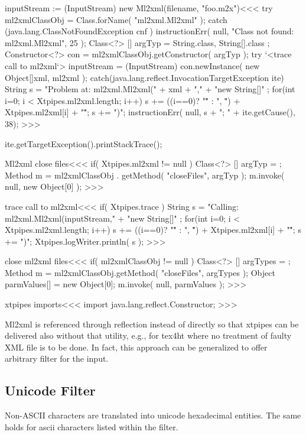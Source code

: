 \documentclass{article}
\begin{document}
\<inputStream := (InputStream) new Ml2xml(filename, "foo.m2x")\><<<
try{
   ml2xmlClassObj = Class.forName( "ml2xml.Ml2xml" );
} catch (java.lang.ClassNotFoundException cnf ){
   instructionErr( null, "Class not found: ml2xml.Ml2xml", 25 );
}
Class<?> [] argTyp = { String.class, String[].class };
Constructor<?> con = ml2xmlClassObj.getConstructor( argTyp );
try{
   `<trace call to ml2xml`>
   inputStream = (InputStream) con.newInstance(
         new Object[]{xml, ml2xml}
      );
} catch(java.lang.reflect.InvocationTargetException ite){
   String s = "Problem at: ml2xml.Ml2xml(" + xml + ","
              + "new String[]{" ;
   for(int i=0; i < Xtpipes.ml2xml.length; i++){
      s += ((i==0)? "\"" : ", \"") + Xtpipes.ml2xml[i] + "\"";
   }
   s += "})";
   instructionErr( null, s + "; " + ite.getCause(), 38);
}
>>>

 ite.getTargetException().printStackTrace();


\<Ml2xml close files\><<<
if( Xtpipes.ml2xml != null ){
   Class<?> [] argTyp = {};
   Method m = ml2xmlClassObj . getMethod( "closeFiles", argTyp );
   m.invoke( null, new Object[0] );
}
>>>

\<trace call to ml2xml\><<<
if( Xtpipes.trace ){
   String s = "Calling: ml2xml.Ml2xml(inputStream,"
              + "new String[]{" ;
   for(int i=0; i < Xtpipes.ml2xml.length; i++){
      s += ((i==0)? "\"" : ", \"") + Xtpipes.ml2xml[i] + "\"";
   }
   s += "})";
   Xtpipes.logWriter.println( s );
}
>>>


\<close ml2xml files\><<<
if( ml2xmlClassObj != null ){
  Class<?> [] argTypes = { };
  Method m = ml2xmlClassObj.getMethod( "closeFiles", argTypes );
  Object parmValues[] = new Object[0];
  m.invoke( null, parmValues );
}
>>>


\<xtpipes imports\><<<
import java.lang.reflect.Constructor;
>>>

Ml2xml is referenced through reflection instead of directly so that xtpipes can
be delivered also without that utility, e.g., for tex4ht where no treatment of faulty
XML file is to be done. In fact, this approach can be generalized to offer
arbitrary filter for the input.




\subsection{Unicode Filter}

Non-ASCII characters are translated into unicode hexadecimal entities.
The same holds for ascii characters listed within the filter.
\end{document}
